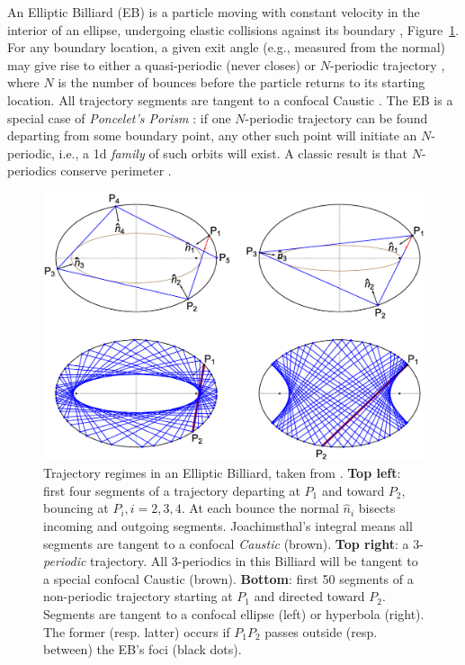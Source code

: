 An Elliptic Billiard (EB) is a particle moving with constant velocity in the interior of an ellipse, undergoing elastic collisions against its boundary \cite{rozikov2018,sergei91}, Figure~\ref{fig:billiard-trajectories}. For any boundary location, a given exit angle (e.g., measured from the normal) may give rise to either a quasi-periodic (never closes) or $N$-periodic trajectory \cite{sergei91}, where $N$ is the number of bounces before the particle returns to its starting location. All trajectory segments are tangent to a confocal Caustic \cite{sergei91}. The EB is a special case of {\em Poncelet's Porism} \cite{dragovic11}: if one $N$-periodic trajectory can be found departing from some boundary point, any other such point will initiate an $N$-periodic, i.e., a 1d {\em family} of such orbits will exist. A classic result is that $N$-periodics conserve perimeter \cite{sergei91}.

\begin{figure}
    \centering
    \includegraphics[width=\textwidth]{pics_1030_billiard_trajectories.eps}
    \caption{Trajectory regimes in an Elliptic Billiard, taken from \cite{reznik2020-intelligencer}. \textbf{Top left}: first four segments of a trajectory departing at $P_1$ and toward $P_2$, bouncing at $P_i, i=2,3,4$. At each bounce the normal $\hat{n}_i$ bisects incoming and outgoing segments. Joachimsthal's integral \cite{sergei91} means all segments are tangent to a confocal {\em Caustic} (brown). \textbf{Top right}: a 3-{\em periodic} trajectory. All 3-periodics in this Billiard will be tangent to a special confocal Caustic (brown). \textbf{Bottom}: first 50 segments of a non-periodic trajectory starting at $P_1$ and directed toward $P_2$. Segments are tangent to a confocal ellipse (left) or hyperbola (right). The former (resp. latter) occurs if $P_1P_2$ passes outside (resp. between) the EB's foci (black dots).}
    \label{fig:billiard-trajectories}
\end{figure}